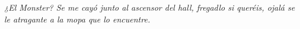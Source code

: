 \thispagestyle{empty}
\mbox{}\vfill\hfill
\emph{¿El Monster? Se me cayó junto al ascensor del hall, fregadlo si queréis, ojalá se le atragante a la mopa que lo encuentre.}
\vfill